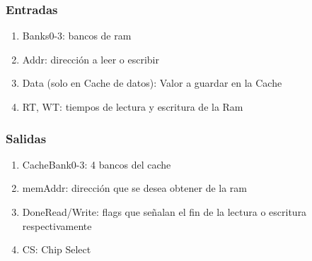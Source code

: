 \documentclass{article}
\begin{document}
                \subsubsection{Entradas}
                \begin{enumerate}
                    \item Banks0-3: bancos de ram 
                    \item Addr: direcci\'on a leer o escribir
                    \item Data (solo en Cache de datos): Valor a guardar en la Cache
                    \item RT, WT: tiempos de lectura y escritura de la Ram
                \end{enumerate}
                \subsubsection{Salidas}
                \begin{enumerate}
                    \item CacheBank0-3: 4 bancos del cache
                    \item memAddr: direcci\'on que se desea obtener de la ram
                    \item DoneRead/Write: flags que se\~nalan el fin de la lectura o escritura respectivamente
                    \item CS: Chip Select
                \end{enumerate}
        
\end{document}
